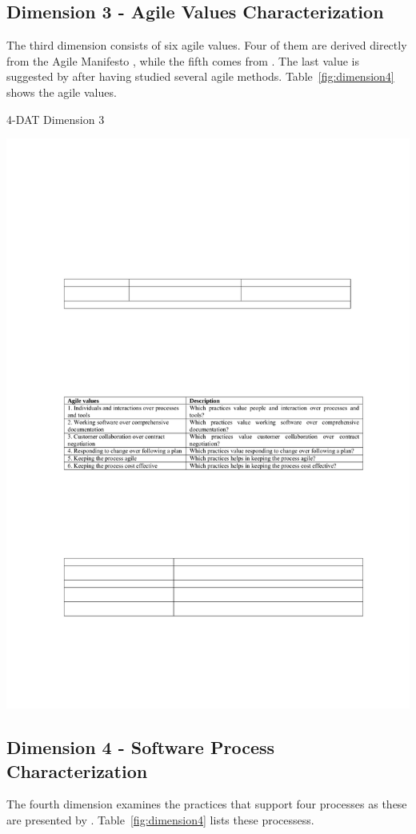 \subsection{Dimension 3 - Agile Values Characterization}
The third dimension consists of six agile values. Four of them are derived directly from the Agile Manifesto \cite{beck2001agile}, while the fifth comes from \cite{koch2005agile}. The last value is suggested by \citet{qumer2006measuring} after having studied several agile methods. Table~\ref{fig:dimension4} shows the agile values.

\begin{table}[H]
\caption{4-DAT Dimension 3}
\label{fig:dimension3}
\centerline{\includegraphics[scale=0.8]{include/relatedwork/fig/qumer_dimension3.pdf}}
\end{table}

\subsection{Dimension 4 - Software Process Characterization}
The fourth dimension examines the practices that support four processes as these are presented by \citet{qumer2006measuring}. Table~\ref{fig:dimension4} lists these processess.

